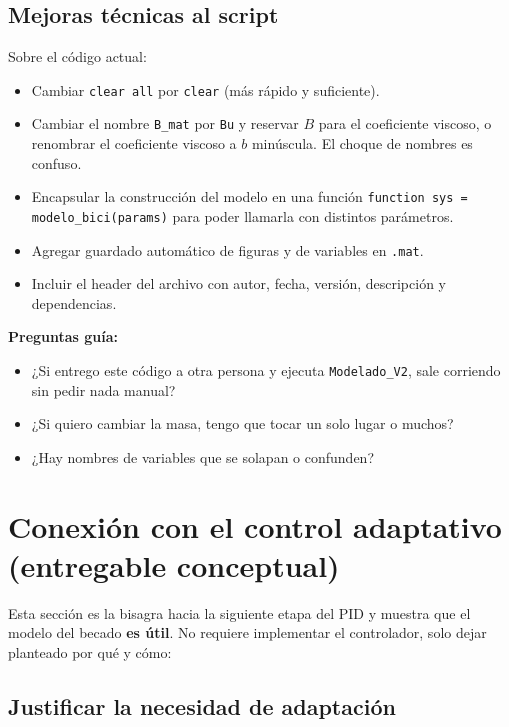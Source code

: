 \documentclass[11pt,a4paper]{article}
\begin{document}
\subsection{Mejoras técnicas al script}

Sobre el código actual:

\begin{itemize}
    \item Cambiar \texttt{clear all} por \texttt{clear} (más rápido y suficiente).
    \item Cambiar el nombre \texttt{B\_mat} por \texttt{Bu} y reservar $B$ para el coeficiente viscoso, o renombrar el coeficiente viscoso a $b$ minúscula. El choque de nombres es confuso.
    \item Encapsular la construcción del modelo en una función \texttt{function sys = modelo\_bici(params)} para poder llamarla con distintos parámetros.
    \item Agregar guardado automático de figuras y de variables en \texttt{.mat}.
    \item Incluir el header del archivo con autor, fecha, versión, descripción y dependencias.
\end{itemize}

\begin{guia}
\textbf{Preguntas guía:}
\begin{itemize}
    \item ¿Si entrego este código a otra persona y ejecuta \texttt{Modelado\_V2}, sale corriendo sin pedir nada manual?
    \item ¿Si quiero cambiar la masa, tengo que tocar un solo lugar o muchos?
    \item ¿Hay nombres de variables que se solapan o confunden?
\end{itemize}
\end{guia}

\hrulefill

\section{Conexión con el control adaptativo (entregable conceptual)}

Esta sección es la bisagra hacia la siguiente etapa del PID y muestra que el modelo del becado \textbf{es útil}. No requiere implementar el controlador, solo dejar planteado por qué y cómo:

\subsection{Justificar la necesidad de adaptación}
\end{document}
